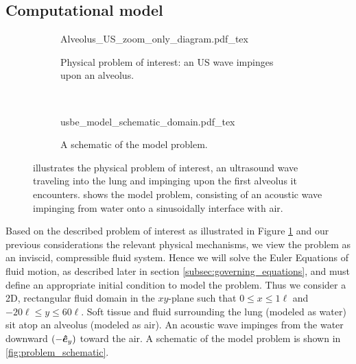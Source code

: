 \subsection{Computational model}
\label{subsec:setup}
%
\begin{figure}[!h]
  \centering
  \begin{subfigure}[b]{0.45\textwidth}
    \centering
    \def\svgwidth{\textwidth}
    {Alveolus_US_zoom_only_diagram.pdf_tex} \hfill%
    \caption{\label{fig:alveolar_schematic} Physical problem of interest: an \ac{US} wave impinges upon an alveolus.}
  \end{subfigure}
  ~
  \begin{subfigure}[b]{0.45\textwidth}
    \centering
    \def\svgwidth{\textwidth}
    {usbe_model_schematic_domain.pdf_tex} \hfill%
    \caption{\label{fig:problem_schematics} A schematic of the model problem.}
  \end{subfigure}
  \caption[A schematic view of the physical and model
  problems]{\protect{} illustrates the
    physical problem of interest, an ultrasound wave traveling into
    the lung and impinging upon the first alveolus it
    encounters. \protect{} shows the model
    problem, consisting of an acoustic wave impinging from water onto
    a sinusoidally interface with air.}
  \label{fig:schematics}
\end{figure}
% 
Based on the described problem of interest as illustrated in Figure
\ref{fig:alveolar_schematic} and our previous considerations the
relevant physical mechanisms, we view the problem as an inviscid,
compressible fluid system. Hence we will solve the Euler Equations of
fluid motion, as described later in section
\ref{subsec:governing_equations}, and must define an appropriate
initial condition to model the problem. Thus we consider a 2D,
rectangular fluid domain in the $xy$-plane such that
$0\leq x\leq 1\ell$ and $-20\ell\leq y\leq 60\ell$. Soft tissue and
fluid surrounding the lung (modeled as water) sit atop an alveolus
(modeled as air). An acoustic wave impinges from the water downward
$(-\boldsymbol{\hat{e}}_y)$ toward the air. A schematic of the model problem
is shown in \ref{fig:problem_schematic}.

